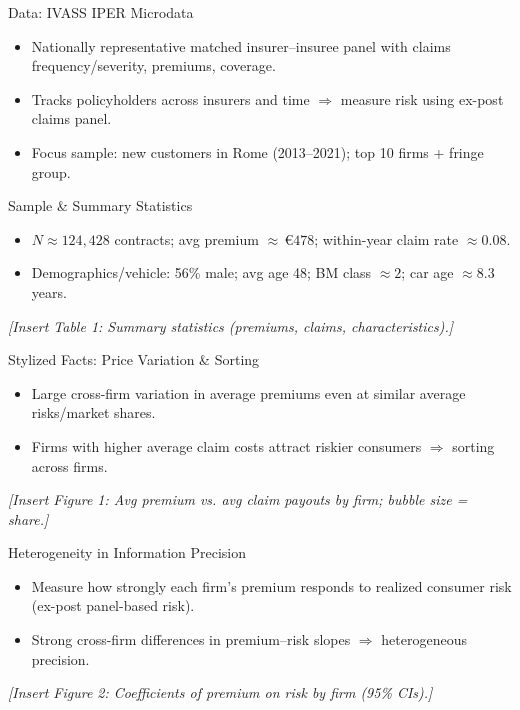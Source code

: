 \documentclass[11pt]{beamer}
\begin{document}
\begin{frame}{Data: IVASS IPER Microdata}
\justifying
\begin{itemize}
  \item Nationally representative matched insurer--insuree panel with claims frequency/severity, premiums, coverage.
  \item Tracks policyholders across insurers and time $\Rightarrow$ measure risk using ex-post claims panel.
  \item Focus sample: new customers in Rome (2013--2021); top 10 firms + fringe group.
\end{itemize}
\end{frame}

\begin{frame}{Sample \& Summary Statistics}
\justifying
\begin{itemize}
  \item $N \approx 124{,}428$ contracts; avg premium $\approx \,€478$; within-year claim rate $\approx 0.08$.
  \item Demographics/vehicle: 56\% male; avg age 48; BM class $\approx 2$; car age $\approx 8.3$ years.
\end{itemize}
\vspace{0.75em}
\begin{center}
\textit{[Insert Table 1: Summary statistics (premiums, claims, characteristics).]}
\end{center}
\end{frame}

\begin{frame}{Stylized Facts: Price Variation \& Sorting}
\justifying
\begin{itemize}
  \item Large cross-firm variation in average premiums even at similar average risks/market shares.
  \item Firms with higher average claim costs attract riskier consumers $\Rightarrow$ sorting across firms.
\end{itemize}
\vspace{0.75em}
\begin{center}
\textit{[Insert Figure 1: Avg premium vs. avg claim payouts by firm; bubble size = share.]}
\end{center}
\end{frame}

\begin{frame}{Heterogeneity in Information Precision}
\justifying
\begin{itemize}
  \item Measure how strongly each firm’s premium responds to realized consumer risk (ex-post panel-based risk).
  \item Strong cross-firm differences in premium–risk slopes $\Rightarrow$ heterogeneous precision.
\end{itemize}
\vspace{0.75em}
\begin{center}
\textit{[Insert Figure 2: Coefficients of premium on risk by firm (95\% CIs).]}
\end{center}
\end{frame}
\end{document}

